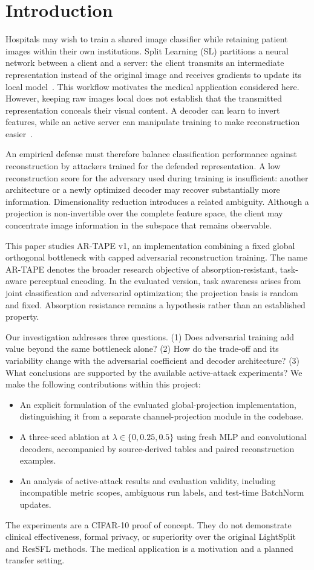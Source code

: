 \section{Introduction}
Hospitals may wish to train a shared image classifier while retaining patient images within their own institutions. Split Learning (SL) partitions a neural network between a client and a server: the client transmits an intermediate representation instead of the original image and receives gradients to update its local model~\cite{vepakomma2018split}. This workflow motivates the medical application considered here. However, keeping raw images local does not establish that the transmitted representation conceals their visual content. A decoder can learn to invert features, while an active server can manipulate training to make reconstruction easier~\cite{pasquini2021fsha}.

An empirical defense must therefore balance classification performance against reconstruction by attackers trained for the defended representation. A low reconstruction score for the adversary used during training is insufficient: another architecture or a newly optimized decoder may recover substantially more information. Dimensionality reduction introduces a related ambiguity. Although a projection is non-invertible over the complete feature space, the client may concentrate image information in the subspace that remains observable.

This paper studies AR-TAPE v1, an implementation combining a fixed global orthogonal bottleneck with capped adversarial reconstruction training. The name AR-TAPE denotes the broader research objective of absorption-resistant, task-aware perceptual encoding. In the evaluated version, task awareness arises from joint classification and adversarial optimization; the projection basis is random and fixed. Absorption resistance remains a hypothesis rather than an established property.

Our investigation addresses three questions. (1) Does adversarial training add value beyond the same bottleneck alone? (2) How do the trade-off and its variability change with the adversarial coefficient and decoder architecture? (3) What conclusions are supported by the available active-attack experiments? We make the following contributions within this project:
\begin{itemize}
\item An explicit formulation of the evaluated global-projection implementation, distinguishing it from a separate channel-projection module in the codebase.
\item A three-seed ablation at $\lambda\in\{0,0.25,0.5\}$ using fresh MLP and convolutional decoders, accompanied by source-derived tables and paired reconstruction examples.
\item An analysis of active-attack results and evaluation validity, including incompatible metric scopes, ambiguous run labels, and test-time BatchNorm updates.
\end{itemize}
The experiments are a CIFAR-10 proof of concept. They do not demonstrate clinical effectiveness, formal privacy, or superiority over the original LightSplit and ResSFL methods. The medical application is a motivation and a planned transfer setting.

